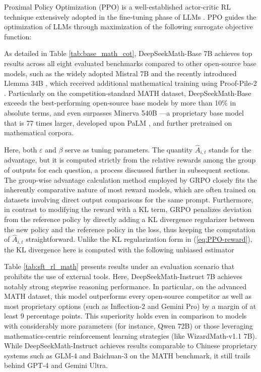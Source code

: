 Proximal Policy Optimization (PPO) \citep{schulman2017proximal} is a well-established actor-critic RL technique extensively adopted in the fine-tuning phase of LLMs \citep{ouyang2022training}. PPO guides the optimization of LLMs through maximization of the following surrogate objective function:

As detailed in Table \ref{tab:base_math_cot}, DeepSeekMath-Base 7B achieves top results across all eight evaluated benchmarks compared to other open-source base models, such as the widely adopted Mistral 7B \citep{mistral} and the recently introduced Llemma 34B \citep{llemma}, which received additional mathematical training using Proof-Pile-2 \citep{llemma}. Particularly on the competition-standard MATH dataset, DeepSeekMath-Base exceeds the best-performing open-source base models by more than 10\% in absolute terms, and even surpasses Minerva 540B \citep{minerva}—a proprietary base model that is 77 times larger, developed upon PaLM \citep{palm}, and further pretrained on mathematical corpora.

Here, both $\varepsilon$ and $\beta$ serve as tuning parameters. The quantity $\hat{A}_{i,t}$ stands for the advantage, but it is computed strictly from the relative rewards among the group of outputs for each question, a process discussed further in subsequent sections. The group-wise advantage calculation method employed by GRPO closely fits the inherently comparative nature of most reward models, which are often trained on datasets involving direct output comparisons for the same prompt. Furthermore, in contrast to modifying the reward with a KL term, GRPO penalizes deviation from the reference policy by directly adding a KL divergence regularizer between the new policy and the reference policy in the loss, thus keeping the computation of $\hat{A}_{i,t}$ straightforward. Unlike the KL regularization form in (\ref{eq:PPO-reward}), the KL divergence here is computed with the following unbiased estimator \citep{kl_approx}

Table \ref{tab:sft_rl_math} presents results under an evaluation scenario that prohibits the use of external tools. Here, DeepSeekMath-Instruct 7B achieves notably strong stepwise reasoning performance. In particular, on the advanced MATH dataset, this model outperforms every open-source competitor as well as most proprietary options (such as Inflection-2 and Gemini Pro) by a margin of at least 9 percentage points. This superiority holds even in comparison to models with considerably more parameters (for instance, Qwen 72B) or those leveraging mathematics-centric reinforcement learning strategies (like WizardMath-v1.1 7B). While DeepSeekMath-Instruct achieves results comparable to Chinese proprietary systems such as GLM-4 and Baichuan-3 on the MATH benchmark, it still trails behind GPT-4 and Gemini Ultra.

